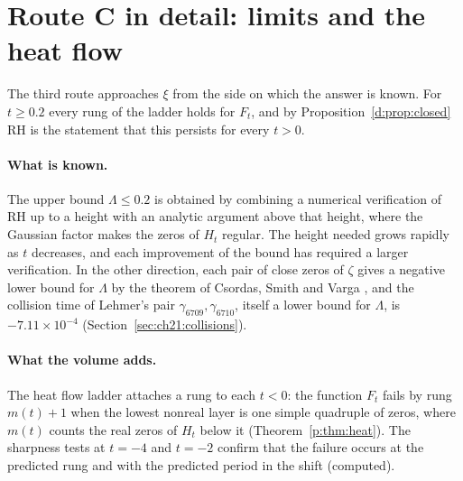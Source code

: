 \section{Route C in detail: limits and the heat flow}\label{d:sec:C}

The third route approaches $\xi$ from the side on which the answer is known. For $t\ge0.2$ every rung of the ladder holds for $F_t$, and by Proposition~\ref{d:prop:closed} RH is the statement that this persists for every $t>0$.

\paragraph{What is known.} The upper bound $\Lambda\le0.2$ \cite{PT21} is obtained by combining a numerical verification of RH up to a height with an analytic argument above that height, where the Gaussian factor makes the zeros of $H_t$ regular. The height needed grows rapidly as $t$ decreases, and each improvement of the bound has required a larger verification. In the other direction, each pair of close zeros of $\zeta$ gives a negative lower bound for $\Lambda$ by the theorem of Csordas, Smith and Varga \cite{CSV94}, and the collision time of Lehmer's pair $\gamma_{6709},\gamma_{6710}$, itself a lower bound for $\Lambda$, is $-7.11\times10^{-4}$ (Section~\ref{sec:ch21:collisions}).%

\paragraph{What the volume adds.} The heat flow ladder attaches a rung to each $t<0$: the function $F_t$ fails by rung $m(t)+1$ when the lowest nonreal layer is one simple quadruple of zeros, where $m(t)$ counts the real zeros of $H_t$ below it (Theorem~\ref{p:thm:heat}). The sharpness tests at $t=-4$ and $t=-2$ confirm that the failure occurs at the predicted rung and with the predicted period in the shift (computed).

